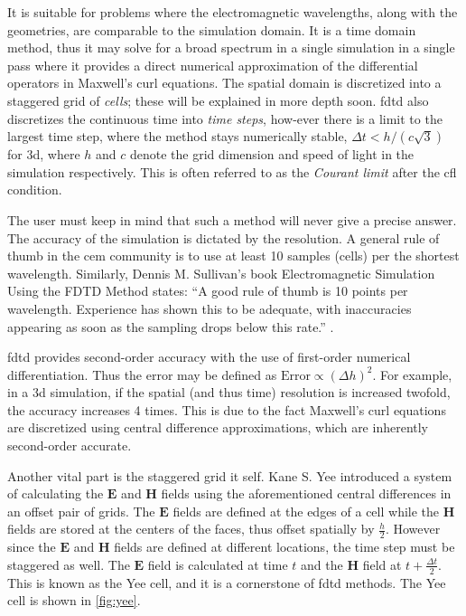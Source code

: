 It is suitable for problems where the electromagnetic wavelengths, along with the geometries, are comparable to the simulation domain. It is a time domain method, thus it may solve for a broad spectrum in a single simulation in a single pass where it provides a direct numerical approximation of the differential operators in Maxwell's curl equations. The spatial domain is discretized into a staggered grid of \textit{cells}; these will be explained in more depth soon. \gls{fdtd} also discretizes the continuous time into \textit{time steps}, how-ever there is a limit to the largest time step, where the method stays numerically stable, $\Delta t < h / \left( c \sqrt{3} \right)$ for \gls{3d}, where $h$ and $c$ denote the grid dimension and speed of light in the simulation respectively. This is often referred to as the \textit{Courant limit} after the \gls{cfl} condition.


The user must keep in mind that such a method will never give a precise answer. The accuracy of the simulation is dictated by the resolution. A general rule of thumb in the \gls{cem} community is to use at least 10 samples (cells) per the shortest wavelength. Similarly, Dennis M. Sullivan's book Electromagnetic Simulation Using the FDTD Method states: “A good rule of thumb is 10 points per wavelength. Experience has shown this to be adequate, with inaccuracies appearing as soon as the sampling drops below this rate.” \cite[p.10]{sullivan2013fdtd}.


\gls{fdtd} provides second-order accuracy with the use of first-order numerical differentiation. Thus the error may be defined as $\text{Error} \propto (\Delta h)^2$. For example, in a \gls{3d} simulation, if the spatial (and thus time) resolution is increased twofold, the accuracy increases 4 times. This is due to the fact Maxwell’s curl equations are discretized using central difference approximations, which are inherently second-order accurate.


Another vital part is the staggered grid it self. Kane S. Yee introduced a system of calculating the $\mathbf{E}$ and $\mathbf{H}$ fields using the aforementioned central differences in an offset pair of grids. The $\mathbf{E}$ fields are defined at the edges of a cell while the $\mathbf{H}$ fields are stored at the centers of the faces, thus offset spatially by $\frac{h}{2}$.  However since the $\mathbf{E}$ and $\mathbf{H}$ fields are defined at different locations, the time step must be staggered as well. The $\mathbf{E}$ field is calculated at time $t$ and the $\mathbf{H}$ field at $t + \frac{\Delta t}{2}$. This is known as the Yee cell, and it is a cornerstone of \gls{fdtd} methods. The Yee cell is shown in \ref{fig:yee}.


